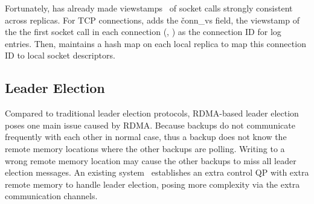 Fortunately, \paxos has already made viewstamps~\cite{paxos:practical} of 
socket calls strongly consistent across replicas. For TCP connections, \xxx 
adds the \v{conn\_vs} field, the viewstamp of the the first socket call in 
each connection (\ie, \accept) as the connection ID for log entries. Then, \xxx 
maintains a hash map on each local replica to map this connection ID to local 
socket descriptors.







\subsection{Leader Election} \label{sec:election}


Compared to traditional \paxos leader election protocols, RDMA-based 
leader election poses one main issue caused by RDMA. Because backups do not 
communicate frequently with each other in normal case, thus a backup does not 
know the remote memory locations where the other backups are polling. Writing to 
a wrong remote memory location may cause the other backups to miss all leader 
election messages. An existing system~\cite{dare:hpdc15} establishes an extra 
control QP with extra remote memory to handle leader election, posing more
complexity via the extra communication channels.

